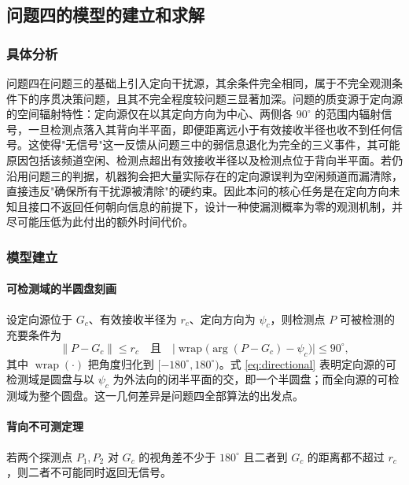 
\subsection{问题四的模型的建立和求解}
\subsubsection{具体分析}

问题四在问题三的基础上引入定向干扰源，其余条件完全相同，属于不完全观测条件下的序贯决策问题，且其不完全程度较问题三显著加深。问题的质变源于定向源的空间辐射特性：定向源仅在以其定向方向为中心、两侧各 $90^\circ$ 的范围内辐射信号，一旦检测点落入其背向半平面，即便距离远小于有效接收半径也收不到任何信号。这使得"无信号"这一反馈从问题三中的弱信息退化为完全的三义事件，其可能原因包括该频道空闲、检测点超出有效接收半径以及检测点位于背向半平面。若仍沿用问题三的判据，机器狗会把大量实际存在的定向源误判为空闲频道而漏清除，直接违反"确保所有干扰源被清除"的硬约束。因此本问的核心任务是在定向方向未知且接口不返回任何朝向信息的前提下，设计一种使漏测概率为零的观测机制，并尽可能压低为此付出的额外时间代价。

\subsubsection{模型建立}

\paragraph{可检测域的半圆盘刻画} 设定向源位于 $G_c$、有效接收半径为 $r_c$、定向方向为 $\psi_c$，则检测点 $P$ 可被检测的充要条件为
\begin{equation}
\lVert P-G_c\rVert\le r_c
\quad\text{且}\quad
\bigl\lvert\operatorname{wrap}\bigl(\arg(P-G_c)-\psi_c\bigr)\bigr\rvert\le90^\circ ,
\label{eq:directional}
\end{equation}
其中 $\operatorname{wrap}(\cdot)$ 把角度归化到 $[-180^\circ,180^\circ)$。式 \eqref{eq:directional} 表明定向源的可检测域是圆盘与以 $\psi_c$ 为外法向的闭半平面的交，即一个半圆盘；而全向源的可检测域为整个圆盘。这一几何差异是问题四全部算法的出发点。

\paragraph{背向不可测定理} 若两个探测点 $P_1,P_2$ 对 $G_c$ 的视角差不少于 $180^\circ$ 且二者到 $G_c$ 的距离都不超过 $r_c$，则二者不可能同时返回无信号。

